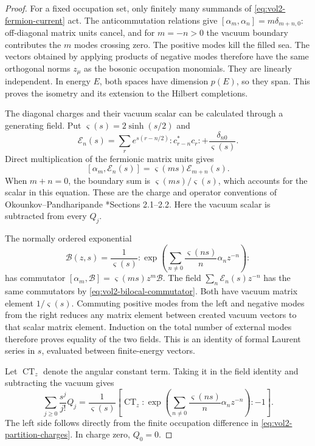 \begin{proof}
For a fixed occupation set, only finitely many summands of
\eqref{eq:vol2-fermion-current} act. The anticommutation relations
give \([\alpha_m,\alpha_n]=m\delta_{m+n,0}\): off-diagonal
matrix units cancel, and for \(m=-n>0\) the vacuum boundary
contributes the \(m\) modes crossing zero. The positive modes
kill the filled sea. The vectors obtained by applying products of
negative modes therefore have the same orthogonal norms
\(z_\mu\) as the bosonic occupation monomials. They are linearly
independent. In energy \(E\), both spaces have dimension \(p(E)\),
so they span. This proves the isometry and its extension to the
Hilbert completions.

The diagonal charges and their vacuum scalar can be calculated
through a generating field. Put \(\varsigma(s)=2\sinh(s/2)\) and
\[
 \mathcal E_n(s)=\sum_r e^{s(r-n/2)}{:}c_{r-n}^*c_r{:}
                   +\frac{\delta_{n0}}{\varsigma(s)}.
\]
Direct multiplication of the fermionic matrix units gives
\begin{equation}\label{eq:vol2-bilocal-commutator}
 [\alpha_m,\mathcal E_n(s)]
       =\varsigma(ms)\mathcal E_{m+n}(s).
\end{equation}
When \(m+n=0\), the boundary sum is
\(\varsigma(ms)/\varsigma(s)\), which accounts for the scalar
in this equation. These are the charge and operator conventions
of Okounkov--Pandharipande \cite{OkounkovPandharipande2002}*{Sections 2.1--2.2}.
Here the vacuum scalar is subtracted from every \(Q_j\).

The normally ordered exponential
\[
 \mathcal B(z,s)=\frac1{\varsigma(s)}
 {:}\exp\!\left(\sum_{n\ne0}
       \frac{\varsigma(ns)}n\alpha_nz^{-n}\right){:}
\]
has commutator
\([\alpha_m,\mathcal B]=\varsigma(ms)z^m\mathcal B\).
The field \(\sum_n\mathcal E_n(s)z^{-n}\) has the same
commutators by \eqref{eq:vol2-bilocal-commutator}.
Both have vacuum matrix element \(1/\varsigma(s)\).
Commuting positive modes from the left and negative modes from the
right reduces any matrix element between created vacuum vectors
to that scalar matrix element. Induction on the total number of
external modes therefore proves equality of the two fields.
This is an identity of formal Laurent series in \(s\), evaluated
between finite-energy vectors.

Let \(\operatorname{CT}_z\) denote the angular constant term.
Taking it in the field identity and subtracting the vacuum gives
\begin{equation}\label{eq:vol2-charge-bilocal}
 \sum_{j\geq0}\frac{s^j}{j!}Q_j
 =\frac1{\varsigma(s)}
 \left[\operatorname{CT}_z
 {:}\exp\!\left(\sum_{n\ne0}
       \frac{\varsigma(ns)}n\alpha_nz^{-n}\right){:}-1\right].
\end{equation}
The left side follows directly from the finite occupation difference
in \eqref{eq:vol2-partition-charges}. In charge zero, \(Q_0=0\).


\end{proof}

